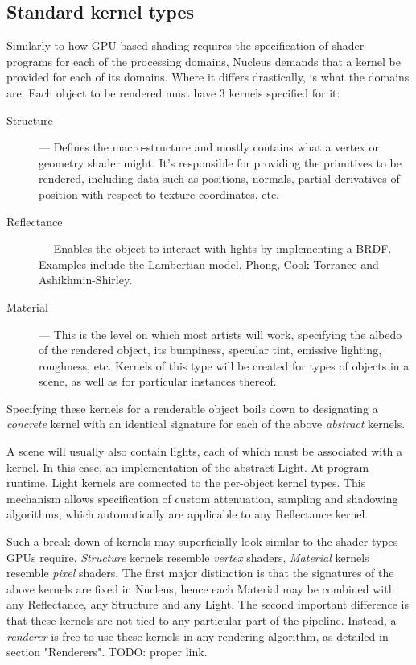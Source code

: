 \subsection{Standard kernel types}

Similarly to how GPU-based shading requires the specification of shader programs for each of the processing domains, Nucleus demands that a kernel be provided for each of its domains. Where it differs drastically, is what the domains are. Each object to be rendered must have 3 kernels specified for it:

\begin{description}

\item[Structure] --- Defines the macro-structure and mostly contains what a vertex or geometry shader might. It's responsible for providing the primitives to be rendered, including data such as positions, normals, partial derivatives of position with respect to texture coordinates, etc.

\item[Reflectance] --- Enables the object to interact with lights by implementing a BRDF. Examples include the Lambertian model, Phong, Cook-Torrance and Ashikhmin-Shirley.

\item[Material] --- This is the level on which most artists will work, specifying the albedo of the rendered object, its bumpiness, specular tint, emissive lighting, roughness, etc. Kernels of this type will be created for types of objects in a scene, as well as for particular instances thereof.

\end{description}

Specifying these kernels for a renderable object boils down to designating a \emph{concrete} kernel with an identical signature for each of the above \emph{abstract} kernels.

A scene will usually also contain lights, each of which must be associated with a kernel. In this case, an implementation of the abstract Light. At program runtime, Light kernels are connected to the per-object kernel types. This mechanism allows specification of custom attenuation, sampling and shadowing algorithms, which automatically are applicable to any Reflectance kernel.


Such a break-down of kernels may superficially look similar to the shader types GPUs require. \emph{Structure} kernels resemble \emph{vertex} shaders, \emph{Material} kernels resemble \emph{pixel} shaders. The first major distinction is that the signatures of the above kernels are fixed in Nucleus, hence each Material may be combined with any Reflectance, any Structure and any Light. The second important difference is that these kernels are not tied to any particular part of the pipeline. Instead, a \emph{renderer} is free to use these kernels in any rendering algorithm, as detailed in section "Renderers". TODO: proper link.

